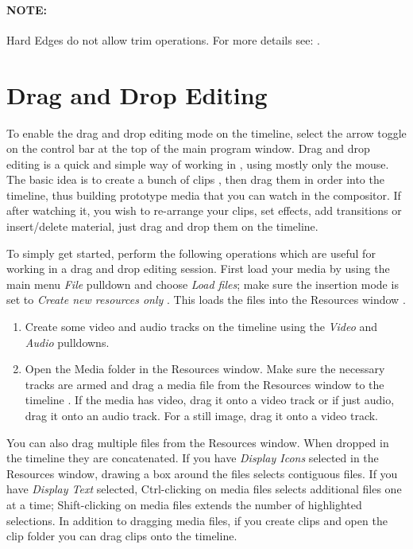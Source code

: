 \paragraph{NOTE:} Hard Edges do not allow trim operations. For more details see: .

\section{Drag and Drop Editing}%
\label{sec:drag_drop_editing}

To enable the drag and drop editing mode on the timeline, select the
arrow toggle  on the control bar at the top of the main program
window.  Drag and drop editing is a quick and simple way of working
in \CGG{}, using mostly only the mouse. The basic idea is to create
a bunch of clips , then drag them in order into the timeline, thus
building prototype media that you can watch in the compositor. If
after watching it, you wish to re-arrange your clips, set effects,
add transitions or insert/delete material, just drag and drop them
on the timeline.

To simply get started, perform the following operations which are
useful for working in a drag and drop editing session.  First load
your media by using the main menu \textit{File} pulldown  and choose
\textit{Load files}; make sure the insertion mode is set to
\textit{Create new resources only} .  This loads the files into the
Resources window .

\begin{enumerate}
\item Create some video and audio tracks on the timeline using
  the \textit{Video}  and \textit{Audio}  pulldowns.
\item Open the Media folder in the Resources window.  Make sure
  the necessary tracks are armed and drag a media file from the
  Resources window to the timeline . If the media has video, drag it
  onto a video track or if just audio, drag it onto an audio
  track. For a still image, drag it onto a video track.
\end{enumerate}

You can also drag multiple files from the Resources window. When
dropped in the timeline they are concatenated. If you have
\textit{Display Icons} selected in the Resources window, drawing a
box around the files selects contiguous files. If you have
\textit{Display Text} selected, Ctrl-clicking on media files selects
additional files one at a time; Shift-clicking on media files
extends the number of highlighted selections.  In addition to
dragging media files, if you create clips and open the clip folder
you can drag clips onto the timeline.

